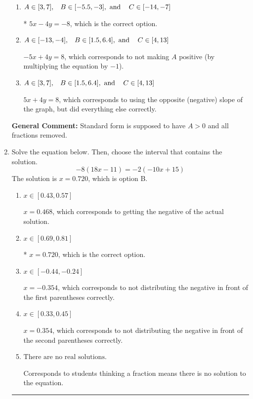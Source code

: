 \documentclass{extbook}[14pt]
\newcommand{\litem}[1]{\item #1

\rule{\textwidth}{0.4pt}}
\begin{document}
\begin{enumerate}
{\begin{enumerate}[label=\Alph*.]
 $-1.25x + 1y = 2.0$, which corresponds to not removing rational values for Standard Form.
\item \( A \in [3, 7], \hspace{3mm} B \in [-5.5, -3], \text{ and } \hspace{3mm} C \in [-14, -7] \)

* $5x - 4y = -8$, which is the correct option.
\item \( A \in [-13, -4], \hspace{3mm} B \in [1.5, 6.4], \text{ and } \hspace{3mm} C \in [4, 13] \)

 $-5x + 4y = 8$, which corresponds to not making $A$ positive (by multiplying the equation by $-1$).
\item \( A \in [3, 7], \hspace{3mm} B \in [1.5, 6.4], \text{ and } \hspace{3mm} C \in [4, 13] \)

 $5x + 4y = 8$, which corresponds to using the opposite (negative) slope of the graph, but did everything else correctly.
\end{enumerate}

\textbf{General Comment:} Standard form is supposed to have $A > 0$ and all fractions removed.
}
\litem{
Solve the equation below. Then, choose the interval that contains the solution.
\[ -8(18x -11) = -2(-10x + 15) \]The solution is \( x = 0.720 \), which is option B.\begin{enumerate}[label=\Alph*.]
\item \( x \in [0.43, 0.57] \)

$x = 0.468$, which corresponds to getting the negative of the actual solution.
\item \( x \in [0.69, 0.81] \)

* $x = 0.720$, which is the correct option.
\item \( x \in [-0.44, -0.24] \)

$x = -0.354$, which corresponds to not distributing the negative in front of the first parentheses correctly.
\item \( x \in [0.33, 0.45] \)

$x = 0.354$, which corresponds to not distributing the negative in front of the second parentheses correctly.
\item \( \text{There are no real solutions.} \)

Corresponds to students thinking a fraction means there is no solution to the equation.
\end{enumerate}

}
\end{enumerate}
\end{document}
